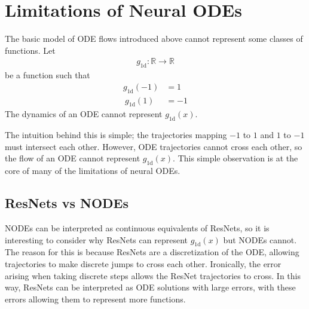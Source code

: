 \documentclass[book.tex]{subfiles}
\begin{document}

\section{Limitations of Neural ODEs}
The basic model of ODE flows introduced above cannot represent some classes of functions. Let 
\begin{align}
g_{1\text{d}} : \mathbb{R} \to \mathbb{R}
\end{align}
be a function such that 
\begin{align}
g_{1\text{d}}(-1) &= 1\\\
g_{1\text{d}}(1) &= -1
\end{align}
The dynamics of an ODE cannot represent $g_{1\text{d}}(x)$.

The intuition behind this is simple; the trajectories mapping $-1$ to $1$ and $1$ to $-1$ must intersect each other. However, ODE trajectories cannot cross each other, so the flow of an ODE cannot represent $g_{1\text{d}}(x)$. This simple observation is at the core of many of the limitations of neural ODEs.


\subsection{ResNets vs NODEs} 
NODEs can be interpreted as continuous equivalents of ResNets, so it is interesting to consider why ResNets can represent $g_{1\text{d}}(x)$ but NODEs cannot. The reason for this is because ResNets are a discretization of the ODE, allowing trajectories to make discrete jumps to cross each other. %
Ironically, the error arising when taking discrete steps allows the ResNet trajectories to cross. In this way, ResNets can be interpreted as ODE solutions with large errors, with these errors allowing them to represent more functions.
\end{document}
